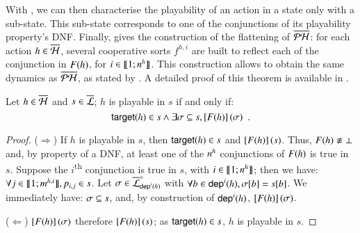 With , we can then characterise the playability of an action in a state only with a sub-state.
This sub-state corresponds to one of the conjunctions of its playability property's DNF.
Finally,  gives the construction of the flattening of $\overline{\mathcal{PH}}$:
for each action $h \in \overline{\mathcal{H}}$, several cooperative sorts $f^{h,i}$ are built to reflect each of the conjunction in $F(h)$,
\ie for $i \in \llbracket 1; n^{h} \rrbracket$.
This construction allows to obtain the same dynamics as $\overline{\mathcal{PH}}$, as stated by .
A detailed proof of this theorem is available in .
%
\begin{lemma}
\label{lem:ppplaysubset}
  Let $h \in \overline{\mathcal{H}}$ and $s \in \overline{\mathcal{L}}$;
  $h$ is playable in $s$ if and only if:
  \[\mathsf{target}(h) \in s \wedge \exists \sigma \subseteq s, \left[F(h)\right](\sigma) \enspace.\]
\end{lemma}
%
\begin{proof}
  ($\Rightarrow$)
    If $h$ is playable in $s$, then $\mathsf{target}(h) \in s$ and $\left[F(h)\right](s)$.
    Thus, $F(h) \not\equiv \bot$ and, by property of a DNF,
    at least one of the $n^{h}$ conjunctions of $F(h)$ is true in $s$.
    Suppose the $i$\textsuperscript{th} conjunction is true in $s$, with $i \in \llbracket 1; n^{h} \rrbracket$;
    then we have: $\forall j \in \llbracket 1; m^{h,i} \rrbracket, p_{i,j} \in s$.
    Let $\sigma \in \overline{\mathcal{L}}^\diamond_{\mathsf{dep}^{i}(h)}$
    with $\forall b \in \mathsf{dep}^{i}(h), {\sigma[b]} = {s[b]}$.
    We immediately have: $\sigma \subseteq s$,
    and, by construction of $\mathsf{dep}^{i}(h)$, $\left[F(h)\right](\sigma)$.
  
  ($\Leftarrow$)
    $\left[F(h)\right](\sigma)$ therefore $\left[F(h)\right](s)$; as $\mathsf{target}(h) \in s$, $h$ is playable in $s$.
\end{proof}

